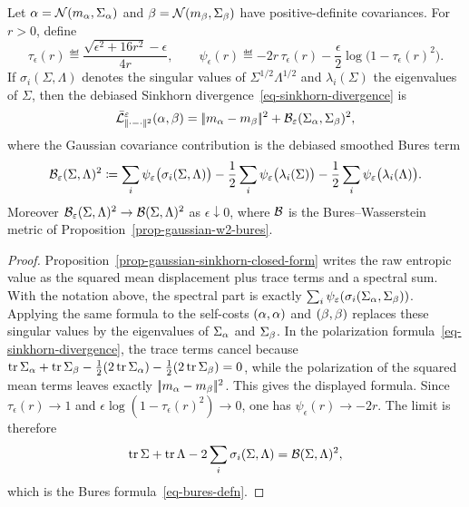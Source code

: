 \begin{cor}\label{cor-gaussian-sinkhorn-divergence}
	Let $\alpha=\mathcal{N}(m_\alpha,\Sigma_\alpha)$ and $\beta=\mathcal{N}(m_\beta,\Sigma_\beta)$ have positive-definite covariances. For $r>0$, define
	\[
		\tau_\epsilon(r)
		\eqdef
		\frac{\sqrt{\epsilon^2+16r^2}-\epsilon}{4r},
		\qquad
		\psi_\epsilon(r)
		\eqdef
		-2r\,\tau_\epsilon(r)
		-\frac{\epsilon}{2}\log\bigl(1-\tau_\epsilon(r)^2\bigr).
	\]
	If $\sigma_i(\Sigma,\Lambda)$ denotes the singular values of $\Sigma^{1/2}\Lambda^{1/2}$ and $\lambda_i(\Sigma)$ the eigenvalues of $\Sigma$, then the debiased Sinkhorn divergence~\eqref{eq-sinkhorn-divergence} is
	\[
		\bar{\mathcal{L}}_{|\!| \cdot-\cdot |\!|^2}^{\varepsilon}(\alpha,\beta)
		=
		|\!| m_\alpha-m_\beta |\!|^2
		+
		\mathcal{B}_\varepsilon(\Sigma_\alpha,\Sigma_\beta)^2,
	\]
	where the Gaussian covariance contribution is the debiased smoothed Bures term
	\[
		\mathcal{B}_\varepsilon(\Sigma,\Lambda)^2
		\coloneqq
		\sum_i \psi_\varepsilon\bigl(\sigma_i(\Sigma,\Lambda)\bigr)
		-\frac12\sum_i\psi_\varepsilon\bigl(\lambda_i(\Sigma)\bigr)
		-\frac12\sum_i\psi_\varepsilon\bigl(\lambda_i(\Lambda)\bigr).
	\]
	Moreover $\mathcal{B}_\varepsilon(\Sigma,\Lambda)^2\to\mathcal{B}(\Sigma,\Lambda)^2$ as $\epsilon\downarrow0$, where $\mathcal{B}$ is the Bures--Wasserstein metric of Proposition~\ref{prop-gaussian-w2-bures}.
\end{cor}

\begin{proof}
	Proposition~\ref{prop-gaussian-sinkhorn-closed-form} writes the raw entropic value as the squared mean displacement plus trace terms and a spectral sum. With the notation above, the spectral part is exactly $\sum_i\psi_\varepsilon(\sigma_i(\Sigma_\alpha,\Sigma_\beta))$. Applying the same formula to the self-costs $(\alpha,\alpha)$ and $(\beta,\beta)$ replaces these singular values by the eigenvalues of $\Sigma_\alpha$ and $\Sigma_\beta$. In the polarization formula~\eqref{eq-sinkhorn-divergence}, the trace terms cancel because
	$\operatorname{tr}\Sigma_\alpha+\operatorname{tr}\Sigma_\beta-\frac12(2\operatorname{tr}\Sigma_\alpha)-\frac12(2\operatorname{tr}\Sigma_\beta)=0$, while the polarization of the squared mean terms leaves exactly $|\!| m_\alpha-m_\beta |\!|^2$. This gives the displayed formula. Since $\tau_\epsilon(r)\to1$ and $\epsilon\log(1-\tau_\epsilon(r)^2)\to0$, one has $\psi_\epsilon(r)\to-2r$. The limit is therefore
	\[
		\operatorname{tr}\Sigma+\operatorname{tr}\Lambda
		-2\sum_i\sigma_i(\Sigma,\Lambda)
		=
		\mathcal{B}(\Sigma,\Lambda)^2,
	\]
	which is the Bures formula~\eqref{eq-bures-defn}.
\end{proof}


